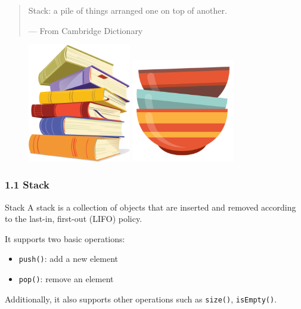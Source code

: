 \documentclass[aspectratio=169, 14pt]{beamer}
\begin{document}
\begin{frame}
    \begin{quote}
        Stack: a pile of things arranged one on top of another.
        \begin{flushright}
            --- From Cambridge Dictionary
        \end{flushright}
    \end{quote}
    \pause
    \begin{figure}
        \includegraphics[width=0.4\textwidth, height=0.4\paperheight]{week3/book}
        \hfill
        \includegraphics[width=0.4\textwidth, height=0.4\paperheight]{week3/tray}
    \end{figure}
    \pause
\end{frame}

\begin{frame}
    \frametitle{1.1 Stack}
\begin{exampleblock}{Stack}
    A stack is a collection of objects that are inserted and removed according to the \alert{last-in, first-out (LIFO)} policy. 
\end{exampleblock}
It supports two basic operations:
\begin{itemize}
    \item \texttt{push()}: add a new element
    \item \texttt{pop()}: remove an element
\end{itemize}
Additionally, it also supports other operations such as \texttt{size()}, \texttt{isEmpty()}.
\end{frame}
\end{document}

